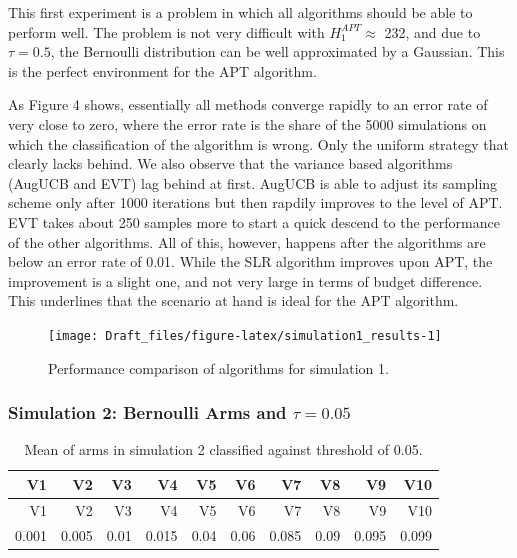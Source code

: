 \documentclass[11pt,]{article}
\begin{document}
This first experiment is a problem in which all algorithms should be
able to perform well. The problem is not very difficult with
\(H_1^{APT} \approx\) 232, and due to \(\tau = 0.5\), the Bernoulli
distribution can be well approximated by a Gaussian. This is the perfect
environment for the APT algorithm.

As Figure 4 shows, essentially all methods converge rapidly to an error
rate of very close to zero, where the error rate is the share of the
5000 simulations on which the classification of the algorithm is wrong.
Only the uniform strategy that clearly lacks behind. We also observe
that the variance based algorithms (AugUCB and EVT) lag behind at first.
AugUCB is able to adjust its sampling scheme only after 1000 iterations
but then rapdily improves to the level of APT. EVT takes about 250
samples more to start a quick descend to the performance of the other
algorithms. All of this, however, happens after the algorithms are below
an error rate of 0.01. While the SLR algorithm improves upon APT, the
improvement is a slight one, and not very large in terms of budget
difference. This underlines that the scenario at hand is ideal for the
APT algorithm.

\begin{figure}

{\centering \texttt{[image: Draft\_files/figure-latex/simulation1\_results-1]} 

}

\caption{Performance comparison of algorithms for simulation 1.}\label{fig:simulation1_results}
\end{figure}

\newpage

\subsubsection{\texorpdfstring{Simulation 2: Bernoulli Arms and
\(\tau = 0.05\)
\label{sec:Simulation2}}{Simulation 2: Bernoulli Arms and \textbackslash{}tau = 0.05 }}\label{simulation-2-bernoulli-arms-and-tau-0.05}

\begin{longtable}[]{@{}rrrrrrrrrr@{}}
\caption{Mean of arms in simulation 2 classified against threshold of
0.05.}\tabularnewline
\toprule
V1 & V2 & V3 & V4 & V5 & V6 & V7 & V8 & V9 & V10\tabularnewline
\midrule
\endfirsthead
\toprule
V1 & V2 & V3 & V4 & V5 & V6 & V7 & V8 & V9 & V10\tabularnewline
\midrule
\endhead
0.001 & 0.005 & 0.01 & 0.015 & 0.04 & 0.06 & 0.085 & 0.09 & 0.095 &
0.099\tabularnewline
\bottomrule
\end{longtable}
\end{document}
